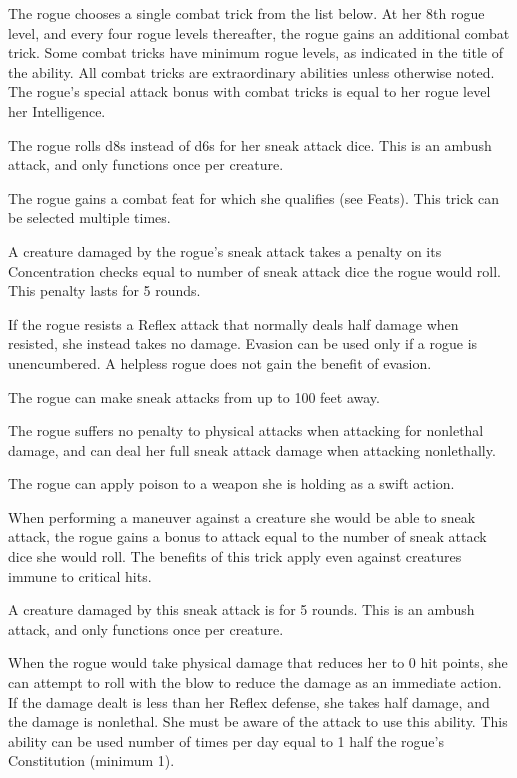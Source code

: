 The rogue chooses a single combat trick from the list below. At her 8th rogue level, and every four rogue levels thereafter, the rogue gains an additional combat trick. Some combat tricks have minimum rogue levels, as indicated in the title of the ability. All combat tricks are extraordinary abilities unless otherwise noted. The rogue's special attack bonus with combat tricks is equal to her rogue level \add her Intelligence.

 The rogue rolls d8s instead of d6s for her sneak attack dice. This is an ambush attack, and only functions once per creature.

 The rogue gains a combat feat for which she qualifies (see Feats). This trick can be selected multiple times.

 A creature damaged by the rogue's sneak attack takes a penalty on its Concentration checks equal to number of sneak attack dice the rogue would roll. This penalty lasts for 5 rounds.

 If the rogue resists a Reflex attack that normally deals half damage when resisted, she instead takes no damage. Evasion can be used only if a rogue is unencumbered. A helpless rogue does not gain the benefit of evasion.

 The rogue can make sneak attacks from up to 100 feet away.

 The rogue suffers no penalty to physical attacks when attacking for nonlethal damage, and can deal her full sneak attack damage when attacking nonlethally.

 The rogue can apply poison to a weapon she is holding as a swift action.

 When performing a maneuver against a creature she would be able to sneak attack, the rogue gains a bonus to attack equal to the number of sneak attack dice she would roll. The benefits of this trick apply even against creatures immune to critical hits.

 A creature damaged by this sneak attack is \bewildered for 5 rounds. This is an ambush attack, and only functions once per creature.

 When the rogue would take physical damage that reduces her to 0 hit points, she can attempt to roll with the blow to reduce the damage as an immediate action. If the damage dealt is less than her Reflex defense, she takes half damage, and the damage is nonlethal. She must be aware of the attack to use this ability. This ability can be used number of times per day equal to 1 \add half the rogue's Constitution (minimum 1).

